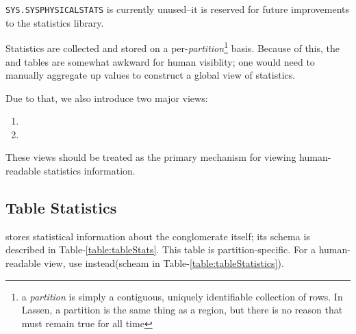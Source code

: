 \texttt{SYS.SYSPHYSICALSTATS} is currently unused--it is reserved for future improvements to the statistics library. 

Statistics are collected and stored on a per-\emph{partition}\footnote{a \emph{partition} is simply a contiguous, uniquely identifiable collection of rows. In Lassen, a partition is the same thing as a region, but there is no reason that must remain true for all time} basis. Because of this, the \systablestats and \syscolumnstats tables are somewhat awkward for human visiblity; one would need to manually aggregate up values to construct a global view of statistics. 

Due to that, we also introduce two major views: 

\begin{enumerate}
\item \systablestatistics
\item \syscolumnstatistics
\end{enumerate}

These views should be treated as the primary mechanism for viewing human-readable statistics information.

\subsection{Table Statistics}
\systablestats stores statistical information about the conglomerate itself; its schema is described in Table-\ref{table:tableStats}. This table is partition-specific. For a human-readable view, use \systablestatistics instead(scheam in Table-\ref{table:tableStatistics}).

